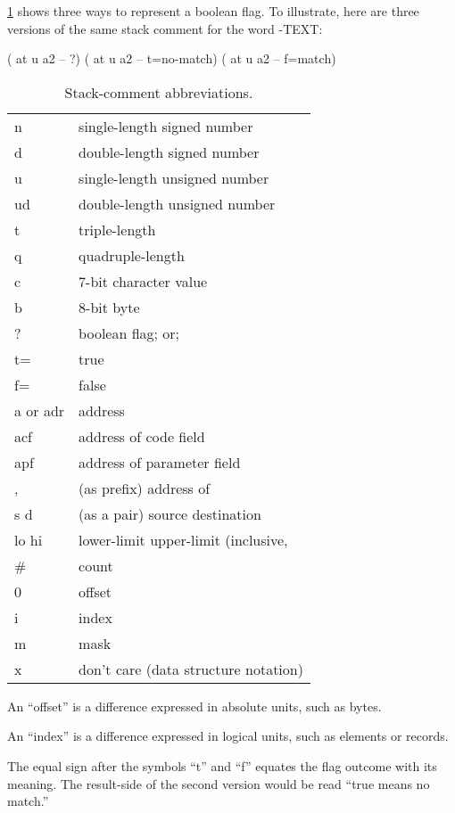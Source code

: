 \ref{tab-5-2} shows three ways to represent a boolean flag.  To illustrate, here
are three versions of the same stack comment for the word -TEXT:
\begin{Code}
( at u a2 -- ?)
( at u a2 -- t=no-match)
( at u a2 -- f=match)
\end{Code}
\begin{table}[tttt]
\caption{Stack-comment abbreviations.}
\label{tab-5-2}
\vspace{1ex}
\blackline{1ex}
\begin{tabular}{@{\hspace{2.5em}}ll}
n             &  single-length signed number \\
d             &  double-length signed number \\
u             &  single-length unsigned number \\
ud            &  double-length unsigned number \\
t             &  triple-length \\
q             &  quadruple-length \\
c             &  7-bit character value \\
b             &  8-bit byte \\
?             &  boolean flag; or; \\
\quad t=         &  true \\
\quad f=         &  false \\
a or adr      &  address \\
acf           &  address of code field \\
apf           &  address of parameter field \\
,             &  (as prefix) address of \\
s d           &  (as a pair) source destination \\
lo hi         &  lower-limit upper-limit (inclusive, \\
\#            &   count \\
0             &  offset \\
i             &  index \\
m             &  mask \\
x             &  don't care (data structure notation) \\
\end{tabular}
\bigskip

An ``offset'' is a difference expressed in absolute units, such as bytes.

An ``index'' is a difference expressed in logical units, such as elements or records.
\vspace{0ex}
\blackline{0ex}
\end{table}
The equal sign after the symbols ``t'' and ``f'' equates the flag outcome
with its meaning.  The result-side of the second version would be read
``true means no match.''


